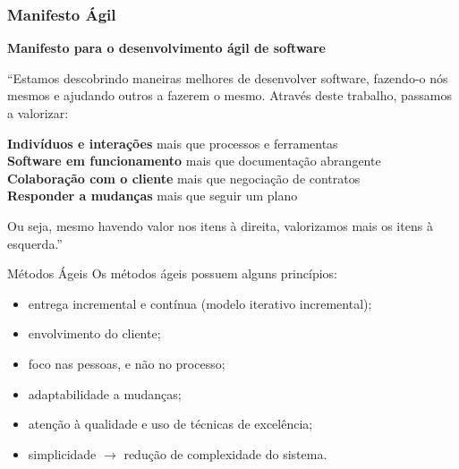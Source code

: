 \documentclass[11pt]{beamer}
\begin{document}
    \begin{frame}
      \frametitle{Manifesto Ágil}

      \textbf{Manifesto para o desenvolvimento ágil de software}

      ``Estamos descobrindo maneiras melhores de desenvolver software, fazendo-o nós mesmos e ajudando outros a fazerem o mesmo. Através deste trabalho, passamos a valorizar:
\\
      \begin{center}
        \textbf{Indivíduos e interações} mais que processos e ferramentas\\
        \textbf{Software em funcionamento} mais que documentação abrangente\\
        \textbf{Colaboração com o cliente} mais que negociação de contratos\\
        \textbf{Responder a mudanças} mais que seguir um plano\\
      \end{center}

      Ou seja, mesmo havendo valor nos itens à direita, valorizamos mais os itens à esquerda.''

      \begin{table}
      \end{table}
    \end{frame}

    \begin{frame}{Métodos Ágeis}
      Os métodos ágeis possuem alguns princípios:
      \begin{itemize}
         \item entrega incremental e contínua (modelo iterativo incremental);
         \item envolvimento do cliente;
         \item foco nas pessoas, e não no processo;
         \item adaptabilidade a mudanças;
         \item atenção à qualidade e uso de técnicas de excelência;
         \item simplicidade $\rightarrow$ redução de complexidade do sistema.
      \end{itemize}
    \end{frame}
    
\end{document}
